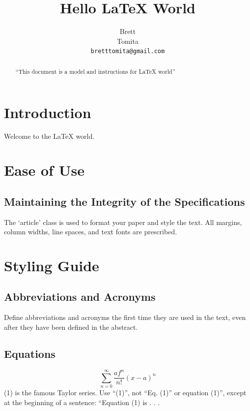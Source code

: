 \documentclass{article}
\begin{document}
\title{Hello \LaTeX \xspace World}
\date{}

\author {Brett \\Tomita \\
\texttt{bretttomita@gmail.com}}
\maketitle

\begin{abstract}
``This document is a model and instructions for \LaTeX\xspace\xspace world''
\end{abstract}

\section{Introduction}
Welcome to the \LaTeX\xspace world.

\section{Ease of Use}

\subsection{Maintaining the Integrity of the Specifications}
The `article' class is used to format your paper and style the text. All margins, column widths, line spaces, and text fonts are prescribed.

\section{Styling Guide}

\subsection{Abbreviations and Acronyms}
Define abbreviations and acronyms the first time they are used in the text, 
even after they have been defined in the abstract.

\subsection{Equations}
\begin{equation}
\sum_{n=0}^{\infty} \frac{af^n}{n!}(x-a)^n
\label{Taylor}
\end{equation}
(1) is the famous Taylor series. Use ``(1)'', not ``Eq. (1)'' or equation (1)'',
except at the beginning of a sentence: ``Equation (1) is . . .
\end{document}
